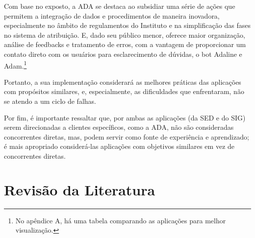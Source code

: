 \documentclass[12pt]{article}
\begin{document}
\par Com base no exposto, a ADA se destaca ao subsidiar uma série de ações que permitem a integração de dados e procedimentos de maneira inovadora, especialmente no âmbito de regulamentos do Instituto e na simplificação das fases no sistema de atribuição. E, dado seu público menor, oferece maior organização, análise de feedbacks e tratamento de erros, com a vantagem de proporcionar um contato direto com os usuários para esclarecimento de dúvidas, o bot Adaline e Adam.\footnote{No apêndice A, há uma tabela comparando as aplicações para melhor visualização.}
\par Portanto, a sua implementação considerará as melhores práticas das aplicações com propósitos similares, e, especialmente, as dificuldades que enfrentaram, não se atendo a um ciclo de falhas.
\par Por fim, é importante ressaltar que, por ambas as aplicações (da SED e do SIG) serem direcionadas a clientes específicos, como a ADA, não são consideradas concorrentes diretas, mas, podem servir como fonte de experiência e aprendizado; é mais apropriado considerá-las aplicações com objetivos similares em vez de concorrentes diretas.



\section{Revisão da Literatura}
\end{document}
